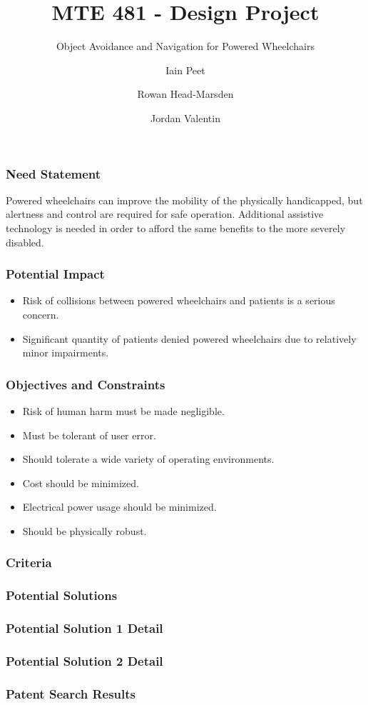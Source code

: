 \documentclass{beamer}
\title{MTE 481 - Design Project}
\subtitle{Object Avoidance and Navigation for Powered Wheelchairs}
\author{Iain Peet \and Rowan Head-Marsden \and Jordan Valentin}
\begin{document}
\begin{frame}
  \titlepage
\end{frame}

\begin{frame}
  \frametitle{Need Statement}
  Powered wheelchairs can improve the mobility of the physically handicapped, but 
  alertness and control are required for safe operation.
  Additional assistive technology is needed in order to afford the same benefits
  to the more severely disabled.
\end{frame}

\begin{frame}
  \frametitle{Potential Impact}
  \begin{itemize}
    \item Risk of collisions between powered wheelchairs and patients is a serious concern. \\
    \item Significant quantity of patients denied powered wheelchairs due to relatively minor impairments. \\
  \end{itemize}
\end{frame}

\begin{frame}
  \frametitle{Objectives and Constraints}
  \begin{itemize}
    \item Risk of human harm must be made negligible. \\
    \item Must be tolerant of user error. \\
    \item Should tolerate a wide variety of operating environments. \\
    \item Cost should be minimized. \\
    \item Electrical power usage should be minimized. \\
    \item Should be physically robust. \\
  \end{itemize}
\end{frame}

\begin{frame}
  \frametitle{Criteria}
\end{frame}

\begin{frame}
  \frametitle{Potential Solutions}
\end{frame}

\begin{frame}
  \frametitle{Potential Solution 1 Detail}
\end{frame}

\begin{frame}
  \frametitle{Potential Solution 2 Detail}
\end{frame}

\begin{frame}
  \frametitle{Patent Search Results}
\end{frame}
\end{document}
